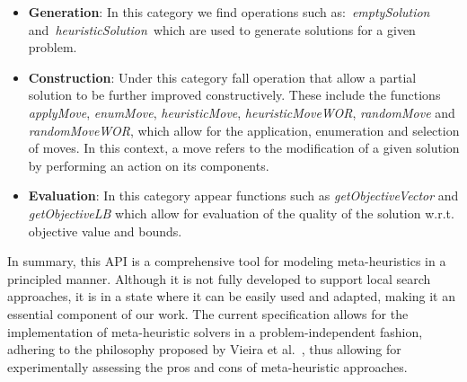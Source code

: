 \begin{itemize}
    \item \textbf{Generation}: In this category we find operations such
          as:~\textit{emptySolution} and~\textit{heuristicSolution}~which are used to
          generate solutions for a given problem.
    \item \textbf{Construction}: Under this category fall operation that
          allow a partial solution to be further improved constructively. These include
          the functions \textit{applyMove}, \textit{enumMove}, \textit{heuristicMove},
          \textit{heuristicMoveWOR}, \textit{randomMove} and \textit{randomMoveWOR},
          which allow for the application, enumeration and selection of moves.
          In this context, a move refers to the modification of a given solution by
          performing an action on its components.
    \item \textbf{Evaluation}: In this category appear functions such
          as \textit{getObjectiveVector} and \textit{getObjectiveLB} which allow for
          evaluation of the quality of the solution w.r.t. objective value and bounds.
\end{itemize}

In summary, this API is a comprehensive tool for modeling meta-heuristics in a
principled manner. Although it is not fully developed to support local search
approaches, it is in a state where it can be easily used and adapted, making it
an essential component of our work. The current specification allows
for the implementation of meta-heuristic solvers in a problem-independent
fashion, adhering to the philosophy proposed by Vieira et
al.~\cite{vieira2009uma}, thus allowing for experimentally assessing the pros
and cons of meta-heuristic approaches.